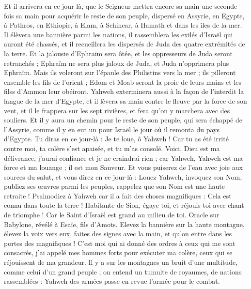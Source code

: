 \begin{multicols}{2}
Et il arrivera en ce jour-là, que le Seigneur mettra encore sa main une seconde fois sa main pour acquérir le reste de son peuple, dispersé en Assyrie, en Egypte, à Pathros, en Ethiopie, à Elam, à Schinear, à Hamath et dans les îles de la mer.
Il élèvera une bannière parmi les nations, il rassemblera les exilés d'Israël qui auront été chassés, et il recueillera les dispersés de Juda des quatre extrémités de la terre.
Et la jalousie d'Ephraïm sera ôtée, et les oppresseurs de Juda seront retranchés ; Ephraïm ne sera plus jaloux de Juda, et Juda n'opprimera plus Ephraïm.
Mais ils voleront sur l'épaule des Philistins vers la mer ; ils pilleront ensemble les fils de l'orient ; Edom et Moab seront la proie de leurs mains et les filss d'Ammon leur obéiront.
Yahweh exterminera aussi à la façon de l'interdit la langue de la mer d'Egypte, et il lèvera sa main contre le fleuve par la force de son vent, et il le frappera sur les sept rivières, et fera qu'on y marchera avec des souliers.
Et il y aura un chemin pour le reste de son peuple, qui sera échappé de l'Assyrie, comme il y en eut un pour Israël le jour où il remonta du pays d'Egypte.
\VerseOne{}Tu diras en ce jour-là : Je te loue, ô Yahweh ! Car tu as été irrité contre moi, ta colère s'est apaisée, et tu m'as consolé.
Voici, Dieu est ma délivrance, j'aurai confiance et je ne craindrai rien ; car Yahweh, Yahweh est ma force et ma louange ; il est mon Sauveur.
Et vous puiserez de l'eau avec joie aux sources du salut,
et vous direz en ce jour-là : Louez Yahweh, invoquez son Nom, publiez ses œuvres parmi les peuples, rappelez que son Nom est une haute retraite !
Psalmodiez à Yahweh car il a fait des choses magnifiques : Cela est connu dans toute la terre !
Habitante de Sion, égaye-toi, et réjouis-toi avec chant de triomphe ! Car le Saint d'Israël est grand au milieu de toi.
\VerseOne{}Oracle sur Babylone, révélé à Esaïe, fils d'Amots.
Elevez la bannière sur la haute montagne, élevez la voix vers eux, faites des signes avec la main, et qu'on entre dans les portes des magnifiques !
C'est moi qui ai donné des ordres à ceux qui me sont consacrés, j'ai appelé mes hommes forts pour exécuter ma colère, ceux qui se réjouissent de ma grandeur.
Il y a sur les montagnes un bruit d'une multitude, comme celui d'un grand peuple ; on entend un tumulte de royaumes, de nations rassemblées : Yahweh des armées passe en revue l'armée pour le combat.

\end{multicols}
